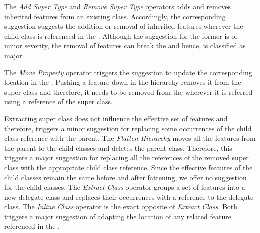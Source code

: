 The \textit{Add Super Type} and \textit{Remove Super Type} operators adds and removes inherited features from an existing class. Accordingly, the corresponding suggestion suggests the addition or removal of inherited features wherever the child class is referenced in the \viewtype. Although the suggestion for the former is of minor severity, the removal of features can break the \viewtype and hence, is classified as major.

The \textit{Move Property} operator triggers the suggestion to update the corresponding location in the \viewtype. Pushing a feature down in the hierarchy removes it from the super class and therefore, it needs to be removed from the \viewtype wherever it is referred using a reference of the super class.

Extracting super class does not influence the effective set of features and therefore, triggers a minor suggestion for replacing some occurrences of the child class reference with the parent. The \textit{Flatten Hierarchy} moves all the features from the parent to the child classes and deletes the parent class. Therefore, this triggers a major suggestion for replacing all the references of the removed super class with the appropriate child class reference. Since the effective features of the child classes remain the same before and after fattening, we offer no suggestion for the child classes. The \textit{Extract Class} operator groups a set of features into a new delegate class and replaces their occurrences with a reference to the delegate class. The \textit{Inline Class} operator is the exact opposite of \textit{Extract Class}. Both triggers a major suggestion of adapting the location of any related feature referenced in the \viewtype.

